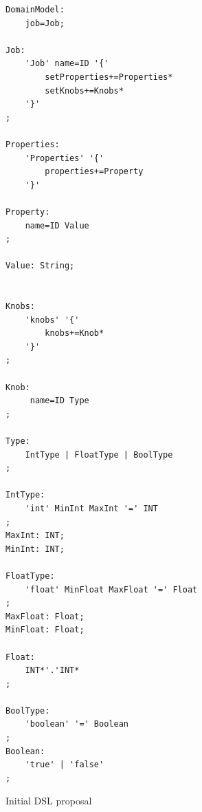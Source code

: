 \singlespacing
\begin{listing}[H]
\begin{verbatim}
DomainModel:
	job=Job;
	
Job:
	'Job' name=ID '{'
        setProperties+=Properties*
		setKnobs+=Knobs*
	'}'
;

Properties:
    'Properties' '{'
        properties+=Property
    '}'

Property:
    name=ID Value
;

Value: String;


Knobs:
	'knobs' '{'
		knobs+=Knob*
	'}' 
;

Knob:
	 name=ID Type
;

Type:
	IntType | FloatType | BoolType
;

IntType:
	'int' MinInt MaxInt '=' INT
;
MaxInt: INT;
MinInt: INT;

FloatType:
	'float' MinFloat MaxFloat '=' Float
;
MaxFloat: Float;
MinFloat: Float;

Float:
	INT*'.'INT*
;

BoolType:
	'boolean' '=' Boolean
;
Boolean:
	'true' | 'false' 
;

\end{verbatim}
\caption{Initial DSL proposal} 
\label{listing:dlsProposal}
\end{listing}

